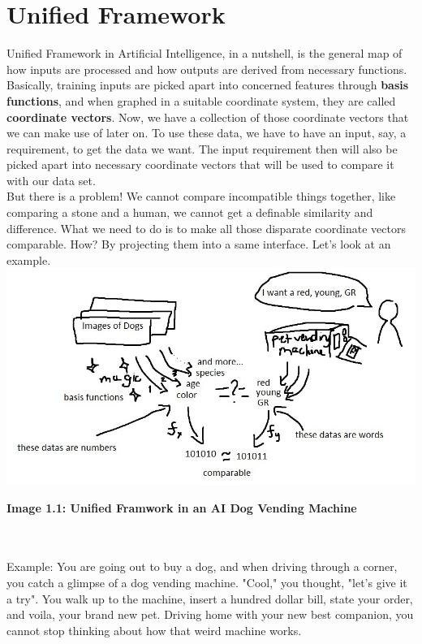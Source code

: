 \documentclass{article}
\begin{document}
\section{Unified Framework}
Unified Framework in Artificial Intelligence, in a nutshell, is the general map of how inputs are processed and how outputs are derived from necessary functions. \\
\tab\tab Basically, training inputs are picked apart into concerned features through \textbf{basis functions}, and when graphed in a suitable coordinate system, they are called \textbf{coordinate vectors}. Now, we have a collection of those coordinate vectors that we can make use of later on. To use these data, we have to have an input, say, a requirement, to get the data we want. The input requirement then will also be picked apart into necessary coordinate vectors that will be used to compare it with our data set.\\
\tab \tab But there is a problem! We cannot compare incompatible things together, like comparing a stone and a human, we cannot get a definable similarity and difference. What we need to do is to make all those disparate coordinate vectors comparable. How? By projecting them into a same interface. Let's look at an example.\\
\includegraphics[scale=0.5]{img1} \\
\centerline{ \small{\textbf{Image 1.1: Unified Framwork in an AI Dog Vending Machine}}} \\\\
\tab\tab Example: You are going out to buy a dog, and when driving through a corner, you catch a glimpse of a dog vending machine. "Cool," you thought, "let's give it a try". You walk up to the machine, insert a hundred dollar bill, state your order, and voila, your brand new pet. Driving home with your new best companion, you cannot stop thinking about how that weird machine works.
\end{document}
